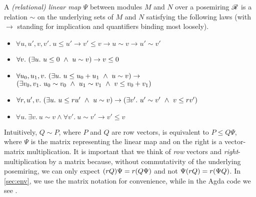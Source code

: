 \begin{definition}
  A \emph{(relational) linear map} $\Psi$ between modules $M$ and $N$ over a
  posemiring $\mathscr R$ is a relation $\sim$ on the underlying sets of $M$ and $N$
  satisfying the following laws (with $\to$ standing for implication and
  quantifiers binding most loosely).
  \begin{itemize}
    \item $\forall u,u',v,v'.~u \leq u' \to v' \leq v \to u \sim v \to u' \sim v'$
    \item $\forall v.~\plr{\exists u.~u \leq 0 \land u \sim v} \to v \leq 0$
    \item $\forall u_0,u_1,v.~\plr{\exists u.~u \leq u_0 + u_1 \land u \sim v}
      \to {}$\\$\plr{\exists v_0,v_1.~u_0 \sim v_0
      \land u_1 \sim v_1 \land v \leq v_0 + v_1}$
    \item $\forall r,u',v.~\plr{\exists u.~u \leq ru' \land u \sim v} \to
      \plr{\exists v'.~u' \sim v' \land v \leq rv'}$
    \item
      $\forall u.~\exists v.~u \sim v \land \forall v'.~u \sim v' \to v' \leq v$
  \end{itemize}
\end{definition}

Intuitively, $Q \sim P$, where $P$ and $Q$ are row vectors, is equivalent to
$P \leq Q\Psi$, where $\Psi$ is the matrix representing the linear map and on
the right is a vector-matrix multiplication.
It is important that we think of \emph{row} vectors and
\emph{right}-multiplication by a matrix because, without commutativity of the
underlying posemiring, we can only expect $\plr{rQ}\Psi = r\plr{Q\Psi}$ and
not $\Psi\plr{rQ} = r\plr{\Psi Q}$.
In \cref{sec:env}, we use the matrix notation for convenience, while in the
Agda code we see .

